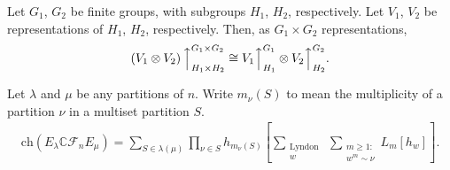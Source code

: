 \documentclass[ALCO, Unicode]{cedram}
\def\ch{\mathrm{ch}}
\def\C{{\mathbb{C}}}
\def\ch{\mathrm{ch}}
\begin{document}
\begin{lemma} \label{lem:induction}
Let $G_1$, $G_2$ be finite groups, with subgroups $H_1$, $H_2$, respectively. Let $V_1$, $V_2$ be representations of $H_1$, $H_2$, respectively. Then, as $G_1 \times G_2$ representations,
\begin{align*}
    \left( V_1 \otimes V_2\right) \Big \uparrow_{H_1 \times H_2}^{G_1 \times G_2} \cong V_1 \Big \uparrow_{H_1}^{G_1} \otimes V_2 \Big \uparrow_{H_2}^{G_2}.
\end{align*}
\end{lemma}




\begin{prop}\label{prop:reduction-to-lambda=n}
Let $\lambda$ and $\mu$ be any partitions of $n.$ Write \textbf{$m_\nu(S)$} to mean the multiplicity of a partition $\nu$ in a multiset partition $S.$
\begin{align*}
    \ch(E_\lambda \C\mathcal{F}_n E_\mu) = \sum_{S \in \lambda(\mu)}\prod_{\nu \in S}h_{m_\nu(S)}\left[\sum_{\substack{\text{Lyndon }\\w}}\sum_{\substack{m \geq 1:\\w^m \sim \nu}}L_{m}[h_{w}]\right].
\end{align*}
\end{prop}
\end{document}
